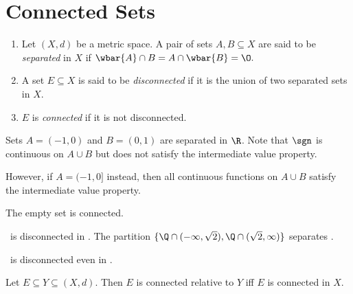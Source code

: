 \section{Connected Sets} \label{sec:connected}
\begin{definition} \label{def:connected} \leavevmode
    \begin{enumerate}[label=(\alph*)]
        \item Let $(X, d)$ be a metric space.
        A pair of sets $A, B \subseteq X$ are said to be \emph{separated} in
        $X$ if $\wbar{A} \cap B = A \cap \wbar{B} = \O.$
        \item A set $E \subseteq X$ is said to be \emph{disconnected} if it
        is the union of two separated sets in $X$.
        \item $E$ is \emph{connected} if it is not disconnected.
    \end{enumerate}
\end{definition}
\begin{examples}
    \item Sets $A = (-1, 0)$ and $B = (0, 1)$ are separated in $\R$.
    Note that $\sgn$ is continuous on $A \cup B$ but does not satisfy the
    intermediate value property.

    However, if $A = (-1, 0]$ instead, then all continuous functions on
    $A \cup B$ satisfy the intermediate value property.
    \item The empty set is connected.
    \item \Q\ is disconnected in \R.
    The partition
    $\{\Q \cap (-\infty, \sqrt 2), \Q \cap (\sqrt 2, \infty)\}$
    separates \Q.
    \item \Q\ is disconnected even in \Q.
\end{examples}
\begin{exercise}
    Let $E \subseteq Y \subseteq (X, d)$.
    Then $E$ is connected relative to $Y$ iff $E$ is connected in $X$.
\end{exercise}

